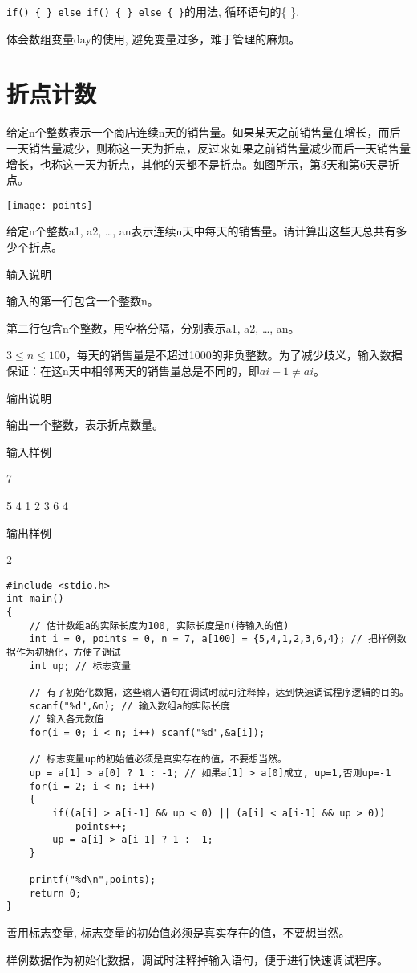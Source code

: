 \begin{note}[要点]
	\lstinline|if() { } else if() { } else { }|的用法, 循环语句的\{ \}.
	
	体会数组变量day的使用, 避免变量过多，难于管理的麻烦。
\end{note}

\section{折点计数}	
给定n个整数表示一个商店连续n天的销售量。如果某天之前销售量在增长，而后一天销售量减少，则称这一天为折点，反过来如果之前销售量减少而后一天销售量增长，也称这一天为折点，其他的天都不是折点。如图所示，第3天和第6天是折点。

\texttt{[image: points]}

给定n个整数a1, a2, \dots, an表示连续n天中每天的销售量。请计算出这些天总共有多少个折点。

输入说明
	
输入的第一行包含一个整数n。

第二行包含n个整数，用空格分隔，分别表示a1, a2, \dots, an。

$3\le n\le 100$，每天的销售量是不超过1000的非负整数。为了减少歧义，输入数据保证：在这n天中相邻两天的销售量总是不同的，即$ai-1\ne ai$。

输出说明	

输出一个整数，表示折点数量。

输入样例	

7

5 4 1 2 3 6 4

输出样例
	
2

\begin{lstlisting}
#include <stdio.h>
int main()
{
    // 估计数组a的实际长度为100, 实际长度是n(待输入的值)
	int i = 0, points = 0, n = 7, a[100] = {5,4,1,2,3,6,4}; // 把样例数据作为初始化，方便了调试
	int up; // 标志变量 
	
	// 有了初始化数据，这些输入语句在调试时就可注释掉，达到快速调试程序逻辑的目的。
	scanf("%d",&n); // 输入数组a的实际长度
	// 输入各元数值
	for(i = 0; i < n; i++) scanf("%d",&a[i]);
	
	// 标志变量up的初始值必须是真实存在的值，不要想当然。
	up = a[1] > a[0] ? 1 : -1; // 如果a[1] > a[0]成立, up=1,否则up=-1
	for(i = 2; i < n; i++)
	{
		if((a[i] > a[i-1] && up < 0) || (a[i] < a[i-1] && up > 0))
			points++;
		up = a[i] > a[i-1] ? 1 : -1;
	}
	
	printf("%d\n",points);
	return 0;
} 
\end{lstlisting}

\begin{note}[要点]
	善用标志变量, 标志变量的初始值必须是真实存在的值，不要想当然。
	
	样例数据作为初始化数据，调试时注释掉输入语句，便于进行快速调试程序。
\end{note}
